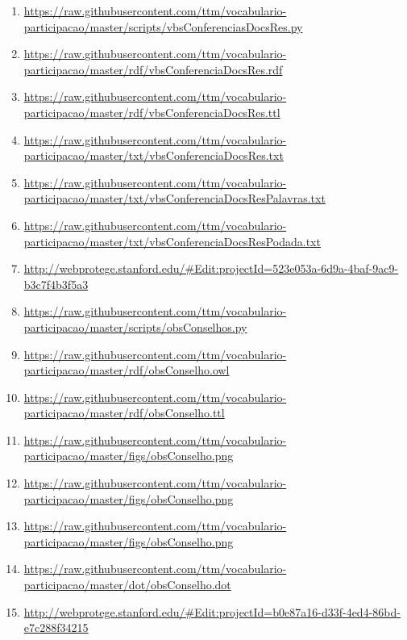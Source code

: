 \documentclass[12pt]{article}
\begin{document}
{\begin{enumerate}
\item \url{https://raw.githubusercontent.com/ttm/vocabulario-participacao/master/scripts/vbsConferenciasDocsRes.py}         \label{i:12a}
     \item \url{https://raw.githubusercontent.com/ttm/vocabulario-participacao/master/rdf/vbsConferenciaDocsRes.rdf}        \label{i:13a}
     \item \url{https://raw.githubusercontent.com/ttm/vocabulario-participacao/master/rdf/vbsConferenciaDocsRes.ttl}        \label{i:14a}
     \item \url{https://raw.githubusercontent.com/ttm/vocabulario-participacao/master/txt/vbsConferenciaDocsRes.txt}        \label{i:16a}
     \item \url{https://raw.githubusercontent.com/ttm/vocabulario-participacao/master/txt/vbsConferenciaDocsResPalavras.txt}\label{i:17a}
     \item \url{https://raw.githubusercontent.com/ttm/vocabulario-participacao/master/txt/vbsConferenciaDocsResPodada.txt}  \label{i:18a}
     \item \url{http://webprotege.stanford.edu/#Edit:projectId=523e053a-6d9a-4baf-9ac9-b3c7f4b3f5a3}  \label{i:18awp}

    \item \url{https://raw.githubusercontent.com/ttm/vocabulario-participacao/master/scripts/obsConselhos.py}\label{i:19}
    \item  \url{https://raw.githubusercontent.com/ttm/vocabulario-participacao/master/rdf/obsConselho.owl}\label{i:20}
    \item  \url{https://raw.githubusercontent.com/ttm/vocabulario-participacao/master/rdf/obsConselho.ttl}\label{i:21}
    \item \url{https://raw.githubusercontent.com/ttm/vocabulario-participacao/master/figs/obsConselho.png}\label{i:22}
    \item \url{https://raw.githubusercontent.com/ttm/vocabulario-participacao/master/figs/obsConselho.png}\label{i:23}
    \item \url{https://raw.githubusercontent.com/ttm/vocabulario-participacao/master/figs/obsConselho.png}\label{i:24}
    \item \url{https://raw.githubusercontent.com/ttm/vocabulario-participacao/master/dot/obsConselho.dot}\label{i:24_1}
    \item \url{http://webprotege.stanford.edu/#Edit:projectId=b0e87a16-d33f-4ed4-86bd-e7c288f34215}\label{i:24wp}


\end{enumerate}}
\end{document}

